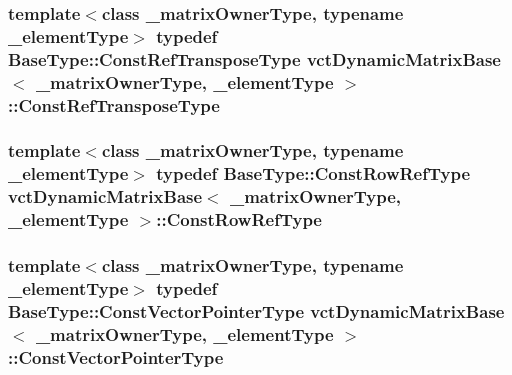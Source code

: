 \hypertarget{classvct_dynamic_matrix_base_a31dd42ab337cbc881f843c09aa141288}{
\subsubsection[{Const\-Ref\-Transpose\-Type}]{\setlength{\rightskip}{0pt plus 5cm}template$<$class \-\_\-matrix\-Owner\-Type, typename \-\_\-element\-Type$>$ typedef {\bf Base\-Type\-::\-Const\-Ref\-Transpose\-Type} {\bf vct\-Dynamic\-Matrix\-Base}$<$ \-\_\-matrix\-Owner\-Type, \-\_\-element\-Type $>$\-::{\bf Const\-Ref\-Transpose\-Type}}}\label{classvct_dynamic_matrix_base_a31dd42ab337cbc881f843c09aa141288}
\hypertarget{classvct_dynamic_matrix_base_ab7670bc2e61331e4228b9e9fa6885329}{
\subsubsection[{Const\-Row\-Ref\-Type}]{\setlength{\rightskip}{0pt plus 5cm}template$<$class \-\_\-matrix\-Owner\-Type, typename \-\_\-element\-Type$>$ typedef {\bf Base\-Type\-::\-Const\-Row\-Ref\-Type} {\bf vct\-Dynamic\-Matrix\-Base}$<$ \-\_\-matrix\-Owner\-Type, \-\_\-element\-Type $>$\-::{\bf Const\-Row\-Ref\-Type}}}\label{classvct_dynamic_matrix_base_ab7670bc2e61331e4228b9e9fa6885329}
\hypertarget{classvct_dynamic_matrix_base_ac8edef5d93a5e13b019a0c12744ddd18}{
\subsubsection[{Const\-Vector\-Pointer\-Type}]{\setlength{\rightskip}{0pt plus 5cm}template$<$class \-\_\-matrix\-Owner\-Type, typename \-\_\-element\-Type$>$ typedef {\bf Base\-Type\-::\-Const\-Vector\-Pointer\-Type} {\bf vct\-Dynamic\-Matrix\-Base}$<$ \-\_\-matrix\-Owner\-Type, \-\_\-element\-Type $>$\-::{\bf Const\-Vector\-Pointer\-Type}}}\label{classvct_dynamic_matrix_base_ac8edef5d93a5e13b019a0c12744ddd18}

